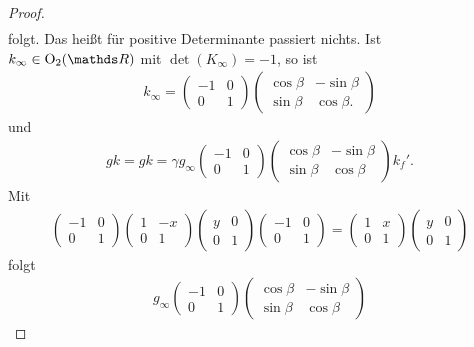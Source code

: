 \begin{proof}
\begin{align*}
\end{align*}
folgt.
Das heißt für positive Determinante passiert nichts.
Ist $k_\infty \in \Oo_2(\R)$ mit $\det(K_\infty)=-1$, so ist
\begin{align*}
k_\infty=\begin{pmatrix}
-1 &0\\
0 &1
\end{pmatrix}
\begin{pmatrix}
\cos \beta &-\sin \beta\\
\sin \beta &\cos \beta.
\end{pmatrix}
\end{align*}
und
\begin{align*}
gk=gk=\gamma g_\infty
\begin{pmatrix}
-1 &0\\
0 &1
\end{pmatrix}
\begin{pmatrix}
\cos \beta &-\sin \beta\\
\sin \beta &\cos \beta
\end{pmatrix} k_f'.
\end{align*}
Mit
\begin{align*}
\begin{pmatrix}
-1 &0\\
0 &1
\end{pmatrix}
\begin{pmatrix}
1 &-x\\
0 &1
\end{pmatrix}
\begin{pmatrix}
y &0\\
0 &1
\end{pmatrix}
\begin{pmatrix}
-1 &0\\
0 &1
\end{pmatrix}
=\begin{pmatrix}
1 &x\\
0 &1
\end{pmatrix}
\begin{pmatrix}
y &0\\
0 &1
\end{pmatrix}
\end{align*}
folgt
\begin{align*}
g_\infty \begin{pmatrix}
-1 &0\\
0 &1
\end{pmatrix}
\begin{pmatrix}
\cos \beta &-\sin \beta\\
\sin \beta &\cos \beta

\end{pmatrix}
\end{align*}
\end{proof}

